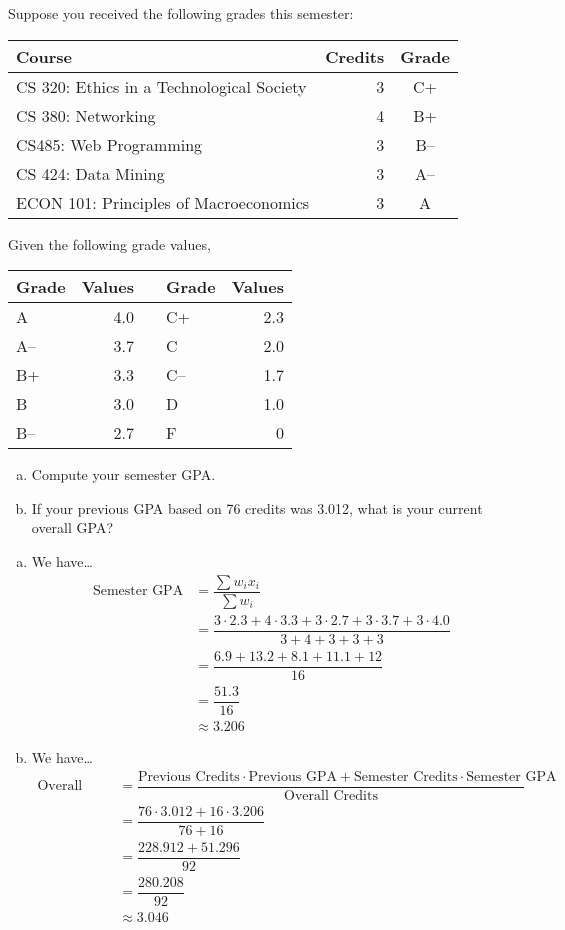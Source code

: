 \documentclass[11pt,letterpaper]{article}
\begin{document}
 Suppose you received the following grades this semester: \par
	\begin{table}[h]
	\centering
	\begin{tabular}{lrc}
	Course & Credits & Grade \\ \hline
	CS 320: Ethics in a Technological Society & 3 & C+ \\
	CS 380: Networking & 4 & B+ \\
	CS485: Web Programming & 3 & B-- \\
	CS 424: Data Mining & 3 & A-- \\
	ECON 101: Principles of Macroeconomics & 3 & A\phantom{--}
	\end{tabular}
	\end{table} \par
Given the following grade values, 
	\begin{table}[h]
	\centering
	\begin{tabular}{lrclr}
	Grade & Values & & Grade & Values \\ \hline
	A & 4.0 & \hspace{1cm} & C+ & 2.3 \\
	A-- & 3.7 & & C & 2.0 \\
	B+ & 3.3 & & C-- & 1.7 \\
	B & 3.0 & & D & 1.0 \\
	B-- & 2.7 & & F & 0
	\end{tabular}
	\end{table}

\begin{enumerate}[(a)]
\item Compute your semester GPA. 
\item If your previous GPA based on 76 credits was 3.012, what is your current overall GPA?
\end{enumerate} \pspace

\sol 
\begin{enumerate}[(a)]
\item We have\dots
	\[
	\begin{aligned}
	\text{Semester GPA}&= \dfrac{\sum w_i x_i}{\sum w_i} \\
	&= \dfrac{3 \cdot 2.3 + 4 \cdot 3.3 + 3 \cdot 2.7 + 3 \cdot 3.7 + 3 \cdot 4.0}{3 + 4 + 3 + 3 + 3} \\
	&= \dfrac{6.9 + 13.2 + 8.1 + 11.1 + 12}{16} \\
	&= \dfrac{51.3}{16} \\
	&\approx 3.206
	\end{aligned}
	\] \pspace

\item We have\dots
	\[
	\begin{aligned}
	\text{Overall GPA}&= \dfrac{\text{Previous Credits} \cdot \text{Previous GPA} + \text{Semester Credits} \cdot \text{Semester GPA}}{\text{Overall Credits}} \\
	&= \dfrac{76 \cdot 3.012 + 16 \cdot 3.206}{76 + 16} \\
	&= \dfrac{228.912 + 51.296}{92} \\
	&= \dfrac{280.208}{92} \\
	&\approx 3.046
	\end{aligned}
	\]
\end{enumerate}
\end{document}

